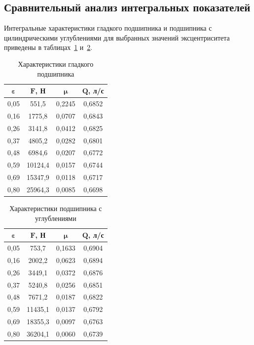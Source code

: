 \subsection{Сравнительный анализ интегральных показателей}

Интегральные характеристики гладкого подшипника и подшипника с цилиндрическими углублениями для выбранных значений эксцентриситета приведены в таблицах~\ref{tab:smooth_results} и~\ref{tab:textured_results}.

\begin{table}[H]
\small
\centering
\caption{Характеристики гладкого подшипника}
\label{tab:smooth_results}
\begin{tabular}{|c|c|c|c|}
\hline
$\boldsymbol{\varepsilon}$ & $\boldsymbol{F}$\textbf{, Н} & $\boldsymbol{\mu}$ & $\boldsymbol{Q}$\textbf{, л/с} \\
\hline
0{,}05 & 551{,}5 & 0{,}2245 & 0{,}6852 \\
\hline
0{,}16 & 1775{,}8 & 0{,}0707 & 0{,}6843 \\
\hline
0{,}26 & 3141{,}8 & 0{,}0412 & 0{,}6825 \\
\hline
0{,}37 & 4805{,}2 & 0{,}0282 & 0{,}6801 \\
\hline
0{,}48 & 6984{,}6 & 0{,}0207 & 0{,}6772 \\
\hline
0{,}59 & 10124{,}4 & 0{,}0157 & 0{,}6744 \\
\hline
0{,}69 & 15347{,}9 & 0{,}0118 & 0{,}6717 \\
\hline
0{,}80 & 25964{,}3 & 0{,}0085 & 0{,}6698 \\
\hline
\end{tabular}
\end{table}

\begin{table}[H]
\small
\centering
\caption{Характеристики подшипника с \varDimpleTypeGenitive{} углублениями}
\label{tab:textured_results}
\begin{tabular}{|c|c|c|c|}
\hline
$\boldsymbol{\varepsilon}$ & $\boldsymbol{F}$\textbf{, Н} & $\boldsymbol{\mu}$ & $\boldsymbol{Q}$\textbf{, л/с} \\
\hline
0{,}05 & 753{,}7 & 0{,}1633 & 0{,}6904 \\
\hline
0{,}16 & 2002{,}2 & 0{,}0623 & 0{,}6894 \\
\hline
0{,}26 & 3449{,}1 & 0{,}0372 & 0{,}6876 \\
\hline
0{,}37 & 5240{,}8 & 0{,}0256 & 0{,}6851 \\
\hline
0{,}48 & 7671{,}2 & 0{,}0187 & 0{,}6822 \\
\hline
0{,}59 & 11435{,}1 & 0{,}0137 & 0{,}6792 \\
\hline
0{,}69 & 18355{,}3 & 0{,}0097 & 0{,}6763 \\
\hline
0{,}80 & 36204{,}1 & 0{,}0060 & 0{,}6739 \\
\hline
\end{tabular}
\end{table}

